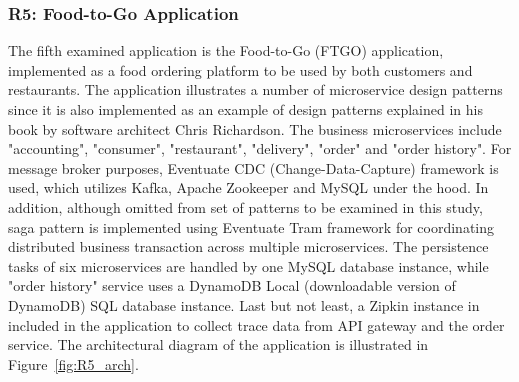 \documentclass{Configuration_Files/PoliMi3i_thesis}
\begin{document}
\subsubsection{R5: Food-to-Go Application}
\label{subsubsec:R5}

The fifth examined application is the Food-to-Go (FTGO) application, implemented as a food ordering platform to be used by both customers and restaurants.
The application illustrates a number of microservice design patterns since it is also implemented as an example of design patterns explained in his book by software architect Chris Richardson\footnotemark[86].
The business microservices include "accounting", "consumer", "restaurant", "delivery", "order" and "order history".
For message broker purposes, Eventuate CDC (Change-Data-Capture)\footnotemark[87] framework is used, which utilizes Kafka, Apache Zookeeper and MySQL under the hood.
In addition, although omitted from set of patterns to be examined in this study, saga pattern is implemented using Eventuate Tram\footnotemark[88] framework for coordinating distributed business transaction across multiple microservices.
The persistence tasks of six microservices are handled by one MySQL database instance, while "order history" service uses a DynamoDB\footnotemark[89] Local (downloadable version of DynamoDB) SQL database instance.
Last but not least, a Zipkin instance in included in the application to collect trace data from API gateway and the order service.
The architectural diagram of the application is illustrated in Figure~\ref{fig:R5_arch}.
\end{document}
